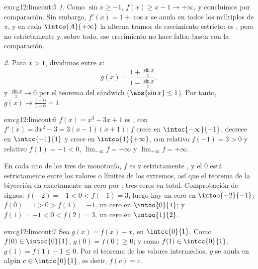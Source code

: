 \begin{solution}{exo:g12:limcont:5}
\emph{1.} Como $\sin x \geq -1$, $f(x) \geq x - 1 \to +\infty$, y
concluimos por comparación. Sin embargo, $f'(x) = 1 + \cos x$ se anula en
todos los múltiplos  de $\pi$, y en cada 
$\intco{A}{+\infty}$ la  alterna tramos de crecimiento estricto: es
, pero no estrictamente y, sobre todo, ese crecimiento no hace
falta: basta con la comparación.

\emph{2.} Para $x > 1$, dividimos entre $x$:
\[
g(x) = \frac{1 + \frac{\sin x}{x}}{1 - \frac{\sin x}{x}},
\]
y $\frac{\sin x}{x} \to 0$ por el teorema del sándwich
($\abs{\sin x} \leq 1$). Por tanto, $g(x) \to \frac{1+0}{1-0} = 1$.
\end{solution}

\begin{solution}{exo:g12:limcont:6}
$f(x) = x^3 - 3x + 1$ es , con
$f'(x) = 3x^2 - 3 = 3(x-1)(x+1)$: $f$ crece en $\intoc{-\infty}{-1}$,
decrece en $\intcc{-1}{1}$ y crece en $\intco{1}{+\infty}$, con 
relativo $f(-1) = 3 > 0$ y  relativo $f(1) = -1 < 0$,
$\lim_{-\infty} f = -\infty$ y $\lim_{+\infty} f = +\infty$.

En cada uno de los tres  de monotonía, $f$ es  y
estrictamente , y el $0$ está estrictamente entre los valores o
límites de los extremos, así que el teorema de la biyección da exactamente
un cero por : tres ceros en total. Comprobación de signos:
$f(-2) = -1 < 0 < f(-1) = 3$, luego hay un cero en $\intoo{-2}{-1}$;
$f(0) = 1 > 0 > f(1) = -1$, un cero en $\intoo{0}{1}$; y
$f(1) = -1 < 0 < f(2) = 3$, un cero en $\intoo{1}{2}$.
\end{solution}

\begin{solution}{exo:g12:limcont:7}
Sea $g(x) = f(x) - x$,  en $\intcc{0}{1}$. Como
$f(0) \in \intcc{0}{1}$, $g(0) = f(0) \geq 0$; y como
$f(1) \in \intcc{0}{1}$, $g(1) = f(1) - 1 \leq 0$. Por el teorema de los
valores intermedios, $g$ se anula en algún $c \in \intcc{0}{1}$, es decir,
$f(c) = c$.
\end{solution}


